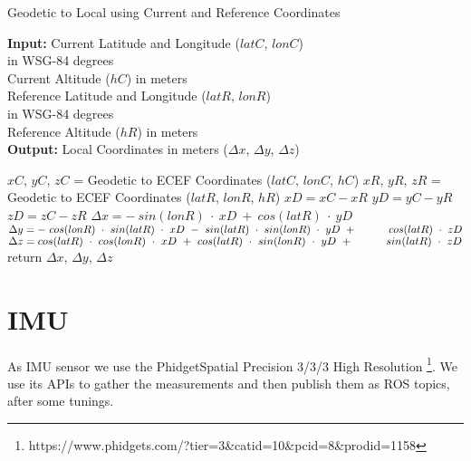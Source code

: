 \begin{algorithm}[H]
\caption{Geodetic to Local using Current and Reference Coordinates}
\label{alg:local}
    \hspace*{\algorithmicindent} \textbf{Input:} Current Latitude and Longitude ($latC$, $lonC$)\\       
        \hspace*{5em} in WSG-84 degrees\\
    \hspace*{4em} Current Altitude ($hC$) in meters\\
    \hspace*{4em} Reference Latitude and Longitude ($latR$, $lonR$)\\    
        \hspace*{5em} in WSG-84 degrees\\
    \hspace*{4em} Reference Altitude ($hR$) in meters \\
    \hspace*{\algorithmicindent} \textbf{Output:} Local Coordinates in meters ($\Delta x$, $\Delta y$, $\Delta z$)
  \begin{algorithmic}[1]
    \STATE $xC$, $yC$, $zC$ = Geodetic to ECEF Coordinates ($latC$, $lonC$, $hC$)
    \STATE $xR$, $yR$, $zR$ = Geodetic to ECEF Coordinates ($latR$, $lonR$, $hR$)
    \STATE $xD = xC - xR$
    \STATE $yD = yC - yR$
    \STATE $zD = zC - zR$
    \STATE $\Delta x = -~sin(lonR)~\cdot~xD~+~cos(latR)~\cdot~yD$
    \STATE $\Delta y = -~cos(lonR)~\cdot~sin(latR)~\cdot~xD~-~sin(latR)~\cdot~sin(lonR)~\cdot~yD~+ \hspace*{3em} cos(latR)~\cdot~zD$
    \STATE $\Delta z = cos(latR)~\cdot~cos(lonR)~\cdot~xD~+~cos(latR)~\cdot~sin(lonR)~\cdot~yD~+  \hspace*{3em} sin(latR)~\cdot~zD$
    \STATE return $\Delta x$, $\Delta y$, $\Delta z$
    \end{algorithmic}
    
\end{algorithm}


\section{IMU}

\noindent
As IMU sensor we use the PhidgetSpatial Precision 3/3/3 High Resolution \footnote{https://www.phidgets.com/?tier=3\&catid=10\&pcid=8\&prodid=1158}.
We use its APIs to gather the measurements and then publish them as ROS topics, after some tunings.


